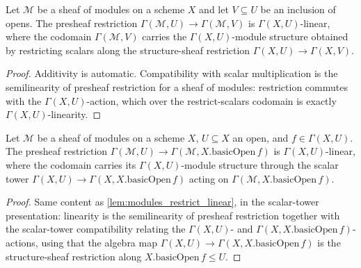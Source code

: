 
\begin{lemma}
  \label{lem:modules_restrict_linear}
  Let \(\mathcal{M}\) be a sheaf of modules on a scheme \(X\) and let \(V \subseteq U\) be an inclusion
  of opens. The presheaf restriction \(\Gamma(\mathcal{M}, U) \to \Gamma(\mathcal{M}, V)\) is
  \(\Gamma(X, U)\)-linear, where the codomain \(\Gamma(\mathcal{M}, V)\) carries the
  \(\Gamma(X, U)\)-module structure obtained by restricting scalars along the structure-sheaf
  restriction \(\Gamma(X, U) \to \Gamma(X, V)\).
\end{lemma}
\begin{proof}
  Additivity is automatic. Compatibility with scalar multiplication is the semilinearity of presheaf
  restriction for a sheaf of modules: restriction commutes with the \(\Gamma(X, U)\)-action, which over
  the restrict-scalars codomain is exactly \(\Gamma(X, U)\)-linearity.
\end{proof}

\begin{lemma}
  \label{lem:modules_restrict_basicOpen_linear}
  Let \(\mathcal{M}\) be a sheaf of modules on a scheme \(X\), \(U \subseteq X\) an open, and
  \(f \in \Gamma(X, U)\). The presheaf restriction
  \(\Gamma(\mathcal{M}, U) \to \Gamma(\mathcal{M}, X.\mathrm{basicOpen}\,f)\) is \(\Gamma(X, U)\)-linear,
  where the codomain carries its \(\Gamma(X, U)\)-module structure through the scalar tower
  \(\Gamma(X, U) \to \Gamma(X, X.\mathrm{basicOpen}\,f)\) acting on
  \(\Gamma(\mathcal{M}, X.\mathrm{basicOpen}\,f)\).
\end{lemma}
\begin{proof}
  Same content as \cref{lem:modules_restrict_linear}, in the scalar-tower presentation: linearity is the
  semilinearity of presheaf restriction together with the scalar-tower compatibility relating the
  \(\Gamma(X, U)\)- and \(\Gamma(X, X.\mathrm{basicOpen}\,f)\)-actions, using that the algebra map
  \(\Gamma(X, U) \to \Gamma(X, X.\mathrm{basicOpen}\,f)\) is the structure-sheaf restriction along
  \(X.\mathrm{basicOpen}\,f \le U\).
\end{proof}

